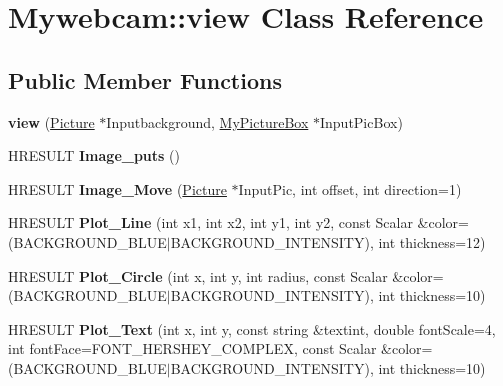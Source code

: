 \hypertarget{class_mywebcam_1_1view}{}\section{Mywebcam\+:\+:view Class Reference}
\label{class_mywebcam_1_1view}
\subsection*{Public Member Functions}
\begin{DoxyCompactItemize}
\item 
\mbox{\label{class_mywebcam_1_1view_a733b8cdc023b63559c4cd5dd393843e1}} 
{\bfseries view} (\hyperlink{class_mywebcam_1_1_picture}{Picture} $\ast$Inputbackground, \hyperlink{class_mywebcam_1_1_my_picture_box}{My\+Picture\+Box} $\ast$Input\+Pic\+Box)
\item 
\mbox{\label{class_mywebcam_1_1view_addeacb2b025700e273ec83c6b6eab163}} 
H\+R\+E\+S\+U\+LT {\bfseries Image\+\_\+puts} ()
\item 
\mbox{\label{class_mywebcam_1_1view_aa9416b0078561e126399736014bae099}} 
H\+R\+E\+S\+U\+LT {\bfseries Image\+\_\+\+Move} (\hyperlink{class_mywebcam_1_1_picture}{Picture} $\ast$Input\+Pic, int offset, int direction=1)
\item 
\mbox{\label{class_mywebcam_1_1view_ae2e264abd68d786b9e1343bf5f1cd10b}} 
H\+R\+E\+S\+U\+LT {\bfseries Plot\+\_\+\+Line} (int x1, int x2, int y1, int y2, const Scalar \&color=(B\+A\+C\+K\+G\+R\+O\+U\+N\+D\+\_\+\+B\+L\+UE$\vert$B\+A\+C\+K\+G\+R\+O\+U\+N\+D\+\_\+\+I\+N\+T\+E\+N\+S\+I\+TY), int thickness=12)
\item 
\mbox{\label{class_mywebcam_1_1view_ae22a40c3016455b92bed9d74e9f560ea}} 
H\+R\+E\+S\+U\+LT {\bfseries Plot\+\_\+\+Circle} (int x, int y, int radius, const Scalar \&color=(B\+A\+C\+K\+G\+R\+O\+U\+N\+D\+\_\+\+B\+L\+UE$\vert$B\+A\+C\+K\+G\+R\+O\+U\+N\+D\+\_\+\+I\+N\+T\+E\+N\+S\+I\+TY), int thickness=10)
\item 
\mbox{\label{class_mywebcam_1_1view_a62dac7f7b338c35252511f73b3882441}} 
H\+R\+E\+S\+U\+LT {\bfseries Plot\+\_\+\+Text} (int x, int y, const string \&textint, double font\+Scale=4, int font\+Face=F\+O\+N\+T\+\_\+\+H\+E\+R\+S\+H\+E\+Y\+\_\+\+C\+O\+M\+P\+L\+EX, const Scalar \&color=(B\+A\+C\+K\+G\+R\+O\+U\+N\+D\+\_\+\+B\+L\+UE$\vert$B\+A\+C\+K\+G\+R\+O\+U\+N\+D\+\_\+\+I\+N\+T\+E\+N\+S\+I\+TY), int thickness=10)

\end{DoxyCompactItemize}

